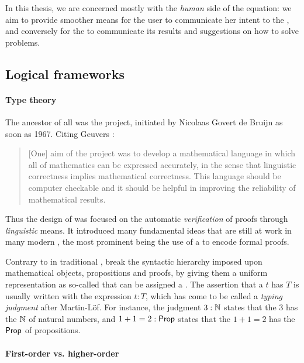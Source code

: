 \begin{emphpar}
In this thesis, we are concerned mostly with the \emph{human} side of the
equation: we aim to provide smoother means for the user to communicate her
intent to the , and conversely for the 
to communicate its results and suggestions on how to solve problems.
\end{emphpar}

\subsection{Logical frameworks}

\paragraph{Type theory}

\AP
The ancestor of all  was the  project,
initiated by Nicolaas Govert de Bruijn as soon as 1967. Citing Geuvers
:
\begin{quote}
[One] aim of the project was to develop a mathematical language in which all of
mathematics can be expressed accurately, in the sense that linguistic
correctness implies mathematical correctness. This language should be computer
checkable and it should be helpful in improving the reliability of mathematical
results.
\end{quote}
\AP
Thus the design of  was focused on the automatic
\emph{verification} of proofs through \emph{linguistic} means. It introduced
many fundamental ideas that are still at work in many modern , the most prominent being the use of a  to encode
formal proofs.

\AP
Contrary to  in traditional ,  break the
syntactic hierarchy imposed upon mathematical objects, propositions and proofs,
by giving them a uniform representation as so-called  that can be
assigned a . The assertion that a  $t$ has  $T$ is usually
written with the expression $t : T$, which has come to be called a \emph{typing
judgment} after Martin-Löf. For instance, the judgment $3 : \mathbb{N}$ states that
the  $3$ has the  $\mathbb{N}$ of natural numbers, and $1 + 1 = 2 : \mathsf{Prop}$
states that the  $1 + 1 = 2$ has the  $\mathsf{Prop}$ of propositions.

\paragraph{First-order vs. higher-order}

